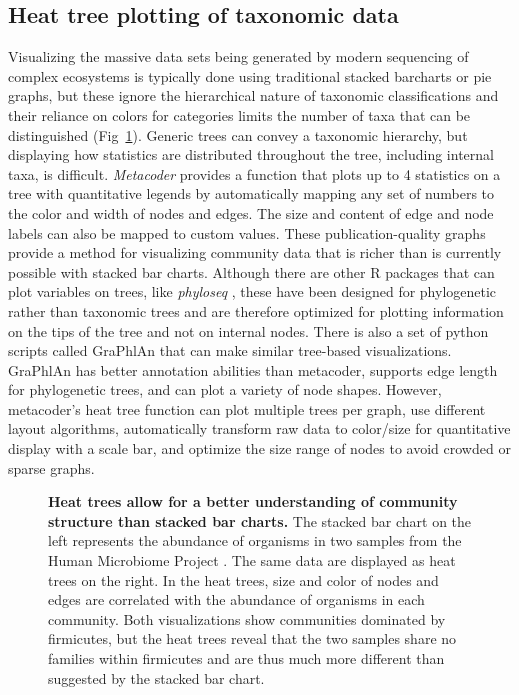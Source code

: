 \documentclass[10pt,letterpaper]{article}
\begin{document}
\subsection*{Heat tree plotting of taxonomic
	data}\label{heat-tree-plotting-of-taxonomic-data}

Visualizing the massive data sets being generated by modern sequencing
of complex ecosystems is typically done using traditional stacked
barcharts or pie graphs, but these ignore the hierarchical nature of
taxonomic classifications and their reliance on colors for categories
limits the number of taxa that can be distinguished (Fig~\ref{fig2}). Generic
trees can convey a taxonomic hierarchy, but displaying how statistics
are distributed throughout the tree, including internal taxa, is
difficult. \emph{Metacoder} provides a function that plots up to 4
statistics on a tree with quantitative legends by automatically mapping
any set of numbers to the color and width of nodes and edges. The size
and content of edge and node labels can also be mapped to custom values.
These publication-quality graphs provide a method for visualizing
community data that is richer than is currently possible with stacked
bar charts. Although there are other R packages that can plot variables
on trees, like \emph{phyloseq} \cite{mcmurdie2013phyloseq}, these have
been designed for phylogenetic rather than taxonomic trees and are
therefore optimized for plotting information on the tips of the tree and
not on internal nodes. There is also a set of python scripts called
GraPhlAn that can make similar tree-based visualizations. GraPhlAn has
better annotation abilities than metacoder, supports edge length for
phylogenetic trees, and can plot a variety of node shapes. However,
metacoder's heat tree function can plot multiple trees per graph, use
different layout algorithms, automatically transform raw data to
color/size for quantitative display with a scale bar, and optimize the
size range of nodes to avoid crowded or sparse graphs.



\begin{figure}[!h]
\caption{{\bf Heat trees allow for a better understanding of community
		structure than stacked bar charts.}
The stacked bar chart on the left
represents the abundance of organisms in two samples from the Human
Microbiome Project \cite{human2012structure}. The same data are
displayed as heat trees on the right. In the heat trees, size and color
of nodes and edges are correlated with the abundance of organisms in
each community. Both visualizations show communities dominated by
firmicutes, but the heat trees reveal that the two samples share no
families within firmicutes and are thus much more different than
suggested by the stacked bar chart.}
\label{fig2}
\end{figure}
\end{document}
